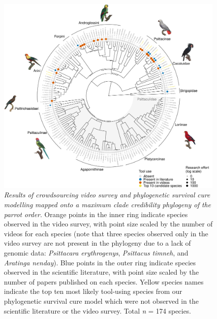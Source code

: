 \documentclass[
  man,floatsintext]{apa6}
\begin{document}
\begin{figure}
\centering
\includegraphics{manuscript_files/figure-latex/plotPhylo1-1.pdf}
\caption{\label{fig:plotPhylo1}\emph{Results of crowdsourcing video survey and phylogenetic
survival cure modelling mapped onto a maximum clade credibility phylogeny of the
parrot order.} Orange points in the inner ring indicate species observed in the
video survey, with point size scaled by the number of videos for each species
(note that three species observed only in the video survey are not present in
the phylogeny due to a lack of genomic data: \emph{Psittacara erythrogenys},
\emph{Psittacus timneh}, and \emph{Aratinga nenday}). Blue points in the outer ring
indicate species observed in the scientific literature, with point size scaled
by the number of papers published on each species. Yellow species names indicate
the top ten most likely tool-using species from our phylogenetic survival cure
model which were not observed in the scientific literature or the video survey.
Total \emph{n} = 174 species.}
\end{figure}
\end{document}
